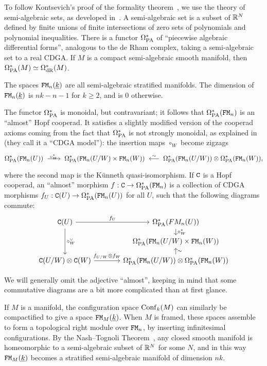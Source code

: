To follow Kontsevich's proof of the formality theorem~\cite{Kontsevich1999}, we use the theory of semi-algebraic sets, as developed in~\cite{KontsevichSoibelman2000,HardtLambrechtsTurchinVolic2011}.
A semi-algebraic set is a subset of $\mathbb{R}^{N}$ defined by finite unions of finite intersections of zero sets of polynomials and polynomial inequalities.
There is a functor $\Omega_{\mathrm{PA}}^{*}$ of ``piecewise algebraic differential forms'', analogous to the de Rham complex, taking a semi-algebraic set to a real CDGA.
If $M$ is a compact semi-algebraic smooth manifold, then $\Omega_{\mathrm{PA}}^{*}(M) \simeq \Omega^{*}_{\mathrm{dR}}(M)$.

The spaces $\mathtt{FM}_{n}(\underline{k})$ are all semi-algebraic stratified manifolds.
The dimension of $\mathtt{FM}_{n}(\underline{k})$ is $nk-n-1$ for $k \geq 2$, and is $0$ otherwise.

The functor $\Omega_{\mathrm{PA}}^{*}$ is monoidal, but contravariant; it follows that $\Omega_{\mathrm{PA}}^{*}(\mathtt{FM}_{n})$ is an ``almost'' Hopf cooperad.
It satisfies a slightly modified version of the cooperad axioms coming from the fact that $\Omega_{\mathrm{PA}}^{*}$ is not strongly monoidal, as explained in~\cite[Definition 3.1]{LambrechtsVolic2014} (they call it a ``CDGA model''): the insertion maps $\circ_{W}$ become zigzags
\[ \OmPA^{*}(\FM_{n}(U)) \tkrightarrow{\circ_{W}^{*}} \OmPA^{*}(\FM_{n}(U/W) \times \FM_{n}(W)) \qiso* \OmPA^{*}(\FM_{n}(U/W)) \otimes \OmPA^{*}(\FM_{n}(W)), \]
where the second map is the Künneth quasi-isomorphism.
If $\mathtt{C}$ is a Hopf cooperad, an ``almost'' morphism $f: \mathtt{C} \to \Omega_{\mathrm{PA}}^{*}(\mathtt{FM}_{n})$ is a collection of CDGA morphisms $f_{U } : \mathtt{C}(U) \to \Omega_{\mathrm{PA}}^{*}(\mathtt{FM}_{n}(U))$ for all $U$, such that the following diagrams commute:
\[ \begin{tikzcd}[column sep = large, row sep = small]
    \CC(U) \ar{r}{f_{U}} \ar{dd}{\circ_{W}^{\vee}} & \OmPA^{*}(FM_{n}(U)) \ar{d}{\circ_{W}^{*}} \\
    {} & \OmPA^{*}(\FM_{n}(U/W) \times \FM_{n}(W)) \\
    \CC(U/W) \otimes \CC(W) \ar{r}{f_{U/W} \otimes f_{W}} & \OmPA^{*}(\FM_{n}(U/W)) \otimes \OmPA^{*}(\FM_{n}(W)) \ar{u}[swap]{\sim}
  \end{tikzcd} \]

We will generally omit the adjective ``almost'', keeping in mind that some commutative diagrams are a bit more complicated than at first glance.

If $M$ is a manifold, the configuration space $\operatorname{Conf}_{k}(M)$ can similarly be compactified to give a space $\mathtt{FM}_{M}(\underline{k})$.
When $M$ is framed, these spaces assemble to form a topological right module over $\mathtt{FM}_{n}$, by inserting infinitesimal configurations.
By the Nash--Tognoli Theorem~\cite{Nash1952,Tognoli1973}, any closed smooth manifold is homeomorphic to a semi-algebraic subset of $\mathbb{R}^{N}$ for some $N$, and in this way $\mathtt{FM}_{M}(\underline{k})$ becomes a stratified semi-algebraic manifold of dimension $nk$.

